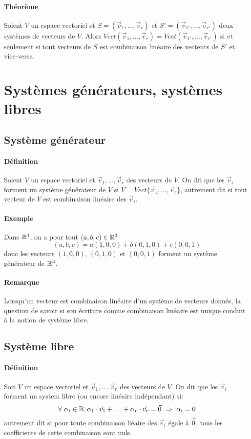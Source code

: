 \paragraph{Théorème} Soient $V$ un espace-vectoriel et $S = (\vec{v}_1, \ldots, \vec{v}_r)$ et $S' = (\vec{v}_{1'}, \ldots, \vec{v}_{r'})$ deux systèmes de vecteurs de $V$. Alors $Vect(\vec{v}_1, \ldots, \vec{v}_r) = Vect(\vec{v}_{1'}, \ldots, \vec{v}_{r'})$ si et seulement si tout vecteurs de $S$ est combinaison linéaire des vecteurs de $S'$ et vice-versa.

%
%
\section{Systèmes générateurs, systèmes libres}
%
%


%
\subsection{Système générateur}
%
\paragraph{Définition} Soient $V$ un espace vectoriel et $\vec{v}_1, \ldots, \vec{v}_r$ des vecteurs de $V$. On dit que les $\vec{v}_i$ forment un système générateur de $V$ si $V = Vect\{\vec{v}_1, \ldots, \vec{v}_r\}$, autrement dit si tout vecteur de $V$ est combinaison linéaire des $\vec{v}_i$.

\paragraph{Exemple} Dans $\mathbb{R}^3$, on a pour tout $(a,b,c) \in \mathbb{R}^3$ $$(a, b, c)=a(1,0,0)+b(0,1,0)+c(0,0,1)$$ donc les vecteurs $(1,0,0)$, $(0,1,0)$ et $(0,0,1)$ forment un système générateur de $\mathbb{R}^3$.

\paragraph{Remarque} Lorsqu'un vecteur est combinaison linéaire d'un système de vecteurs donnés, la question de savoir si son écriture comme combinaison linéaire est unique conduit à la notion de système libre.


%
\subsection{Système libre}
%
\paragraph{Définition} Soit $V$ un espace vectoriel et $\vec{v}_1, \ldots , \vec{v}_r$ des vecteurs de $V$. On dit que les $\vec{v}_i$ forment un system libre (ou encore linéaire indépendant) si:
$$\forall ~ \alpha_i \in \mathbb{R}, \alpha_1 \cdot \vec{v}_1 + \ldots + \alpha_r \cdot \vec{v}_r = \vec{0} ~ \Rightarrow ~ \alpha_i = 0$$
autrement dit si pour toute combinaison liéaire des $\vec{v}_i$ égale à $\vec{0}$, tous les coefficients de cette combinaison sont nuls.
